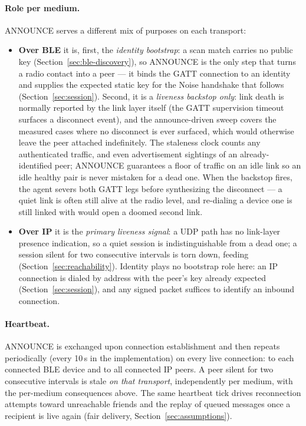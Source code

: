 \paragraph{Role per medium.}
ANNOUNCE serves a different mix of purposes on each transport:
\begin{itemize}
\item \textbf{Over BLE} it is, first, the \emph{identity bootstrap}: a scan match carries no public key (Section~\ref{sec:ble-discovery}), so ANNOUNCE is the only step that turns a radio contact into a peer --- it binds the GATT connection to an identity and supplies the expected static key for the Noise handshake that follows (Section~\ref{sec:session}).  Second, it is a \emph{liveness backstop only}: link death is normally reported by the link layer itself (the GATT supervision timeout surfaces a disconnect event), and the announce-driven sweep covers the measured cases where no disconnect is ever surfaced, which would otherwise leave the peer attached indefinitely.  The staleness clock counts any authenticated traffic, and even advertisement sightings of an already-identified peer; ANNOUNCE guarantees a floor of traffic on an idle link so an idle healthy pair is never mistaken for a dead one.  When the backstop fires, the agent severs both GATT legs before synthesizing the disconnect --- a quiet link is often still alive at the radio level, and re-dialing a device one is still linked with would open a doomed second link.
\item \textbf{Over IP} it is the \emph{primary liveness signal}: a UDP path has no link-layer presence indication, so a quiet session is indistinguishable from a dead one; a session silent for two consecutive intervals is torn down, feeding  (Section~\ref{sec:reachability}).  Identity plays no bootstrap role here: an IP connection is dialed by address with the peer's key already expected (Section~\ref{sec:session}), and any signed packet suffices to identify an inbound connection.
\end{itemize}

\paragraph{Heartbeat.}
ANNOUNCE is exchanged upon connection establishment and then repeats periodically (every 10\,s in the implementation) on every live connection: to each connected BLE device and to all connected IP peers.  A peer silent for two consecutive intervals is stale \emph{on that transport}, independently per medium, with the per-medium consequences above.  The same heartbeat tick drives reconnection attempts toward unreachable friends and the replay of queued messages once a recipient is live again (fair delivery, Section~\ref{sec:assumptions}).

